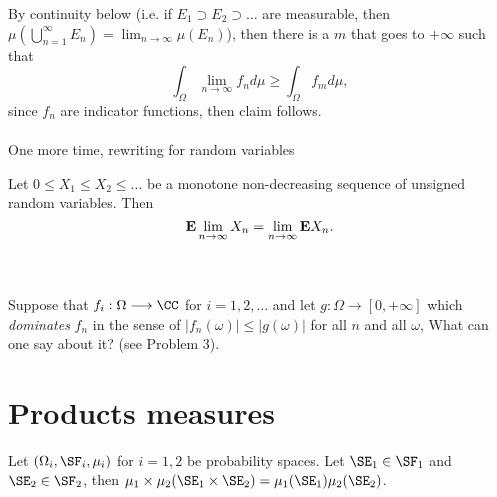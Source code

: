 \documentclass[11pt]{scrartcl}
\begin{document}
  By continuity below (i.e. if $E_{1} \supset E_{2} \supset \dots$ are measurable, then $\mu(\bigcup_{n=1}^{\infty} E_{n}) = \lim_{n \to \infty} \mu(E_{n})$), then there is a $m$ that goes to $+\infty$ such that
  $$
  \int_{\Omega} \lim_{n \to \infty} f_{n} d\mu \geq \int_{\Omega} f_{m} d\mu,
  $$
  since $f_{n}$  are indicator functions, then claim follows. \\ \\
  One more time, rewriting for random variables
  \begin{theorem}
    Let $0 \leq X_{1} \leq X_{2} \leq \dots$ be a monotone non-decreasing sequence of unsigned random variables. Then
    $$
    {\bf E} \lim_{n \to \infty} X_{n} = \lim_{n \to \infty} {\bf E} X_{n}.
    $$
  \end{theorem} \\ \\
  Suppose that $f_{i}: \Omega \longrightarrow \CC$ for $i = 1, 2, \dots$ and let $g: \Omega \longrightarrow [0, +\infty]$ which \emph{dominates} $f_{n}$ in the sense of $|f_{n}(\omega)| \leq |g(\omega)|$ for all $n$ and all $\omega $, What can one say about it? (see Problem 3).

\section{Products measures}
Let $(\Omega_{i}, \SF_{i}, \mu_{i})$ for $i= 1,2$ be probability spaces. Let $\SE_{1} \in \SF_{1}$ and $\SE_{2} \in \SF_{2}$, then $\mu_{1} \times \mu_{2}(\SE_{1} \times \SE_{2}) = \mu_{1}(\SE_{1})\mu_{2}(\SE_{2})$.
\end{document}
